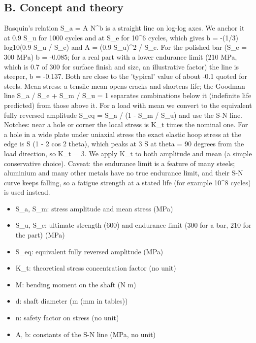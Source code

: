 \documentclass[11pt,a4paper]{article}
\begin{document}
\subsection*{B. Concept and theory}
Basquin's relation S\_a = A N\textasciicircum{}b is a straight line on log-log axes. We anchor it at 0.9 S\_u for 1000 cycles and at S\_e for 10\textasciicircum{}6 cycles, which gives b = -(1/3) log10(0.9 S\_u / S\_e) and A = (0.9 S\_u)\textasciicircum{}2 / S\_e. For the polished bar (S\_e = 300 MPa) b = -0.085; for a real part with a lower endurance limit (210 MPa, which is 0.7 of 300 for surface finish and size, an illustrative factor) the line is steeper, b = -0.137. Both are close to the 'typical' value of about -0.1 quoted for steels. Mean stress: a tensile mean opens cracks and shortens life; the Goodman line S\_a / S\_e + S\_m / S\_u = 1 separates combinations below it (indefinite life predicted) from those above it. For a load with mean we convert to the equivalent fully reversed amplitude S\_eq = S\_a / (1 - S\_m / S\_u) and use the S-N line. Notches: near a hole or corner the local stress is K\_t times the nominal one. For a hole in a wide plate under uniaxial stress the exact elastic hoop stress at the edge is S (1 - 2 cos 2 theta), which peaks at 3 S at theta = 90 degrees from the load direction, so K\_t = 3. We apply K\_t to both amplitude and mean (a simple conservative choice). Caveat: the endurance limit is a feature of many steels; aluminium and many other metals have no true endurance limit, and their S-N curve keeps falling, so a fatigue strength at a stated life (for example 10\textasciicircum{}8 cycles) is used instead.

\begin{itemize}[nosep]
\item S\_a, S\_m: stress amplitude and mean stress (MPa)
\item S\_u, S\_e: ultimate strength (600) and endurance limit (300 for a bar, 210 for the part) (MPa)
\item S\_eq: equivalent fully reversed amplitude (MPa)
\item K\_t: theoretical stress concentration factor (no unit)
\item M: bending moment on the shaft (N m)
\item d: shaft diameter (m (mm in tables))
\item n: safety factor on stress (no unit)
\item A, b: constants of the S-N line (MPa, no unit)
\end{itemize}
\end{document}
